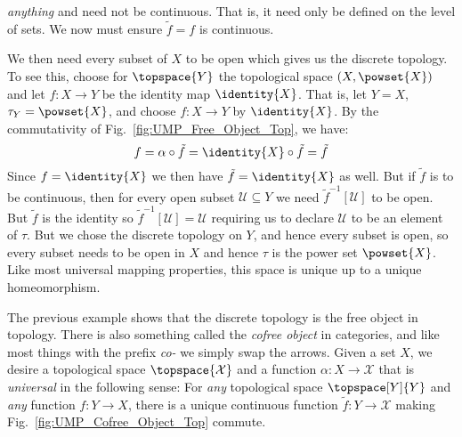 \begin{example}
\begin{minipage}[b]{0.588\textwidth}
                \textit{anything} and need not be continuous. That is,
                it need only be defined on the level of sets. We now
                must ensure $\tilde{f}=f$ is continuous.
            \end{minipage}
            \par\vspace{2.5ex}
            We then need every subset of $X$ to be open which
            gives us the discrete topology. To see this, choose for
            $\topspace{Y}$ the topological space $(X,\powset{X})$
            and let $f:X\rightarrow{Y}$ be the identity map $\identity{X}$.
            That is, let $Y=X$, $\tau_{Y}=\powset{X}$, and choose
            $f:X\rightarrow{Y}$ by $\identity{X}$. By the commutativity
            of Fig.~\ref{fig:UMP_Free_Object_Top}, we have:
            \begin{equation}
                f=\alpha\circ\tilde{f}
                    =\identity{X}\circ\tilde{f}
                    =\tilde{f}
            \end{equation}
            Since $f=\identity{X}$ we then have $\tilde{f}=\identity{X}$
            as well. But if $\tilde{f}$ is to be continuous, then for
            every open subset $\mathcal{U}\subseteq{Y}$ we need
            $\tilde{f}^{\minus{1}}[\mathcal{U}]$ to be open. But
            $\tilde{f}$ is the identity so
            $\tilde{f}^{\minus{1}}[\mathcal{U}]=\mathcal{U}$ requiring
            us to declare $\mathcal{U}$ to be an element of $\tau$. But
            we chose the discrete topology on $Y$, and hence every
            subset is open, so every subset needs to be open in $X$ and
            hence $\tau$ is the power set $\powset{X}$. Like most
            universal mapping properties, this space is unique up to a
            unique homeomorphism.
        \end{example}
        The previous example shows that the discrete topology is the
        free object in topology. There is also something called the
        \textit{cofree object} in categories, and like most things with
        the prefix \textit{co-} we simply swap the arrows. Given a set
        $X$, we desire a topological space $\topspace{\mathcal{X}}$ and
        a function $\alpha:X\rightarrow\mathcal{X}$ that is
        \textit{universal} in the following sense: For \textit{any}
        topological space $\topspace[Y]{Y}$ and \textit{any} function
        $f:Y\rightarrow{X}$, there is a unique continuous function
        $\tilde{f}:Y\rightarrow\mathcal{X}$ making
        Fig.~\ref{fig:UMP_Cofree_Object_Top} commute.
